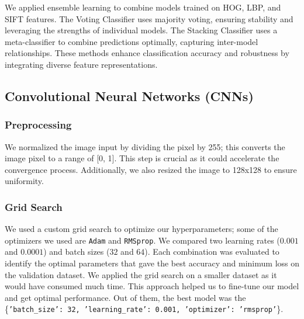 \documentclass[10pt,twocolumn,letterpaper]{article}
\begin{document}
We applied ensemble learning to combine models trained on HOG, LBP, and SIFT features. The Voting Classifier uses majority voting, ensuring stability and leveraging the strengths of individual models. The Stacking Classifier uses a meta-classifier to combine predictions optimally, capturing inter-model relationships. These methods enhance classification accuracy and robustness by integrating diverse feature representations.

\subsection{Convolutional Neural Networks (CNNs)}

\subsubsection{Preprocessing}
We normalized the image input by dividing the pixel by 255; this converts the image pixel to a range of [0, 1]. This step is crucial as it could accelerate the convergence process. Additionally, we also resized the image to 128x128 to ensure uniformity.

\subsubsection{Grid Search}
We used a custom grid search to optimize our hyperparameters; some of the optimizers we used are \texttt{Adam} and \texttt{RMSprop}. We compared two learning rates (\(0.001\) and \(0.0001\)) and batch sizes (\(32\) and \(64\)). Each combination was evaluated to identify the optimal parameters that gave the best accuracy and minimum loss on the validation dataset. We applied the grid search on a smaller dataset as it would have consumed much time. This approach helped us to fine-tune our model and get optimal performance. Out of them, the best model was the \{\texttt{'batch\_size': 32, 'learning\_rate': 0.001, 'optimizer': 'rmsprop'}\}.
\end{document}
